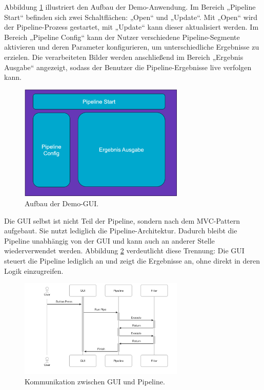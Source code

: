 \documentclass[10pt,a4paper]{article}
\begin{document}
Abbildung \ref{fig:application_structure} illustriert den Aufbau der Demo-Anwendung. Im Bereich „Pipeline Start“ befinden sich zwei Schaltflächen: „Open“ und „Update“. Mit „Open“ wird der Pipeline-Prozess gestartet, mit „Update“ kann dieser aktualisiert werden. Im Bereich „Pipeline Config“ kann der Nutzer verschiedene Pipeline-Segmente aktivieren und deren Parameter konfigurieren, um unterschiedliche Ergebnisse zu erzielen. Die verarbeiteten Bilder werden anschließend im Bereich „Ergebnis Ausgabe“ angezeigt, sodass der Benutzer die Pipeline-Ergebnisse live verfolgen kann.

\begin{figure}[htbp]
    \centering
    \includegraphics[width=0.7\textwidth]{img/ApplicationStructure.png}
    \caption{Aufbau der Demo-GUI.}
    \label{fig:application_structure}
\end{figure}

\begin{samepage}
Die GUI selbst ist nicht Teil der Pipeline, sondern nach dem MVC-Pattern aufgebaut. Sie nutzt lediglich die Pipeline-Architektur. Dadurch bleibt die Pipeline unabhängig von der GUI und kann auch an anderer Stelle wiederverwendet werden. Abbildung \ref{fig:gui_pipeline_interface} verdeutlicht diese Trennung: Die GUI steuert die Pipeline lediglich an und zeigt die Ergebnisse an, ohne direkt in deren Logik einzugreifen.

\begin{figure}[htbp]
    \centering
    \includegraphics[width=0.7\textwidth]{img/GuiPipelineInterface.png}
    \caption{Kommunikation zwischen GUI und Pipeline.}
    \label{fig:gui_pipeline_interface}
\end{figure}
\end{samepage}
\end{document}
